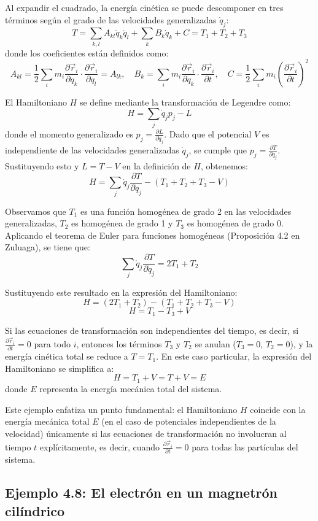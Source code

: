 \documentclass[a4paper]{article}
\begin{document}
Al expandir el cuadrado, la energía cinética se puede descomponer en tres términos según el grado de las velocidades generalizadas $\dot{q}_j$:
$$T = \sum_{k,l} A_{kl} \dot{q}_k \dot{q}_l + \sum_k B_k \dot{q}_k + C = T_1 + T_2 + T_3$$
donde los coeficientes están definidos como:
$$A_{kl} = \frac{1}{2} \sum_i m_i \frac{\partial \vec{r}_i}{\partial q_k} \cdot \frac{\partial \vec{r}_i}{\partial q_l} = A_{lk}, \quad B_k = \sum_i m_i \frac{\partial \vec{r}_i}{\partial q_k} \cdot \frac{\partial \vec{r}_i}{\partial t}, \quad C = \frac{1}{2} \sum_i m_i \left(\frac{\partial \vec{r}_i}{\partial t}\right)^2$$

El Hamiltoniano $H$ se define mediante la transformación de Legendre como:
$$H = \sum_j \dot{q}_j p_j - L$$
donde el momento generalizado es $p_j = \frac{\partial L}{\partial \dot{q}_j}$. Dado que el potencial $V$ es independiente de las velocidades generalizadas $\dot{q}_j$, se cumple que $p_j = \frac{\partial T}{\partial \dot{q}_j}$. Sustituyendo esto y $L = T - V$ en la definición de $H$, obtenemos:
$$H = \sum_j \dot{q}_j \frac{\partial T}{\partial \dot{q}_j} - (T_1 + T_2 + T_3 - V)$$

Observamos que $T_1$ es una función homogénea de grado 2 en las velocidades generalizadas, $T_2$ es homogénea de grado 1 y $T_3$ es homogénea de grado 0. Aplicando el teorema de Euler para funciones homogéneas (Proposición 4.2 en Zuluaga), se tiene que:
$$\sum_j \dot{q}_j \frac{\partial T}{\partial \dot{q}_j} = 2T_1 + T_2$$

Sustituyendo este resultado en la expresión del Hamiltoniano:
$$H = (2T_1 + T_2) - (T_1 + T_2 + T_3 - V)$$
$$H = T_1 - T_3 + V$$

Si las ecuaciones de transformación son independientes del tiempo, es decir, si $\frac{\partial \vec{r}_i}{\partial t} = 0$ para todo $i$, entonces los términos $T_3$ y $T_2$ se anulan ($T_3 = 0$, $T_2 = 0$), y la energía cinética total se reduce a $T = T_1$. En este caso particular, la expresión del Hamiltoniano se simplifica a:
$$H = T_1 + V = T + V = E$$
donde $E$ representa la energía mecánica total del sistema.

Este ejemplo enfatiza un punto fundamental: el Hamiltoniano $H$ coincide con la energía mecánica total $E$ (en el caso de potenciales independientes de la velocidad) únicamente si las ecuaciones de transformación no involucran al tiempo $t$ explícitamente, es decir, cuando $\frac{\partial \vec{r}_i}{\partial t} = 0$ para todas las partículas del sistema.


\subsection{Ejemplo 4.8: El electrón en un magnetrón cilíndrico}
\end{document}

